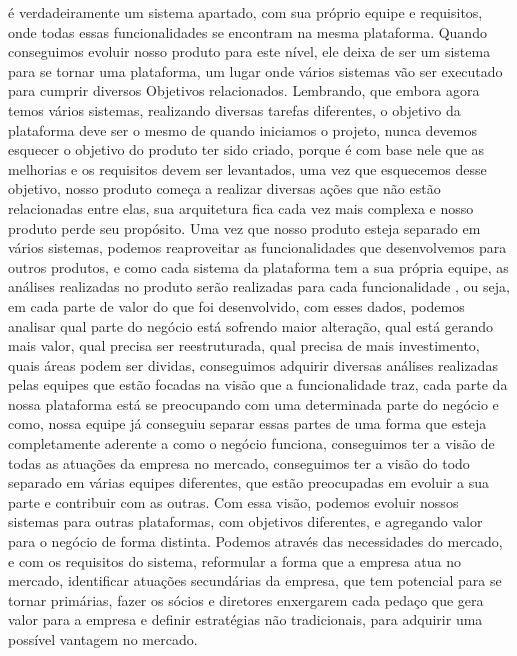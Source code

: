       é verdadeiramente um sistema apartado, com sua próprio equipe e requisitos,
      onde todas essas funcionalidades se encontram na mesma plataforma. Quando
      conseguimos evoluir nosso produto para este nível, ele deixa de ser um sistema
      para se tornar uma plataforma, um lugar onde vários sistemas vão ser executado
      para cumprir diversos Objetivos relacionados. Lembrando, que embora agora
      temos vários sistemas, realizando diversas tarefas diferentes, o objetivo
      da plataforma deve ser o mesmo de quando iniciamos o projeto, nunca devemos
      esquecer o objetivo do produto ter sido criado, porque é com base nele que
      as melhorias e os requisitos devem ser levantados, uma vez que esquecemos
      desse objetivo, nosso produto começa a realizar diversas ações que não
      estão relacionadas entre elas, sua arquitetura fica cada vez mais complexa
      e nosso produto perde seu propósito. \newline
      Uma vez que nosso produto esteja separado em vários sistemas, podemos reaproveitar
      as funcionalidades que desenvolvemos para outros produtos, e como cada sistema
      da plataforma tem a sua própria equipe, as análises realizadas no produto
      serão realizadas para cada funcionalidade , ou seja, em cada parte de valor
      do que foi desenvolvido, com esses dados, podemos analisar qual parte do negócio
      está sofrendo maior alteração, qual está gerando mais valor, qual precisa
      ser reestruturada, qual precisa de mais investimento, quais áreas podem ser
      dividas, conseguimos adquirir diversas análises realizadas pelas equipes que
      estão focadas na visão que a funcionalidade traz, cada parte da nossa plataforma
      está se preocupando com uma determinada parte do negócio e como, nossa equipe
      já conseguiu separar essas partes de uma forma que esteja completamente
      aderente a como o negócio funciona, conseguimos ter a visão de todas as atuações
      da empresa no mercado, conseguimos ter a visão do todo separado em várias
      equipes diferentes, que estão preocupadas em evoluir a sua parte e contribuir
      com as outras. Com essa visão, podemos evoluir nossos sistemas para outras
      plataformas, com objetivos diferentes, e agregando valor para o negócio de
      forma distinta. Podemos através das necessidades do mercado, e com os requisitos
      do sistema, reformular a forma que a empresa atua no mercado, identificar
      atuações secundárias da empresa, que tem potencial para se tornar primárias,
      fazer os sócios e diretores enxergarem cada pedaço que gera valor para a
      empresa e definir estratégias não tradicionais, para adquirir uma possível
      vantagem no mercado.

